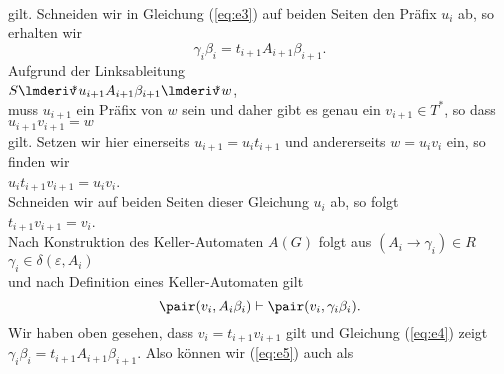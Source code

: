 \begin{enumerate}
            \\[0.2cm]
            gilt.  Schneiden wir in Gleichung (\ref{eq:e3}) auf beiden Seiten den Pr\"afix
            $u_i$ ab, so erhalten wir
            \begin{equation}
              \label{eq:e4}
              \gamma_i \beta_i = t_{i+1} A_{i+1}\beta_{i+1}.
            \end{equation}
            Aufgrund der Linksableitung
            \\[0.2cm]
            \hspace*{1.3cm}
            $S \lmderiv\!\!^* u_{i+1}A_{i+1}\beta_{i+1} \lmderiv\!\!^* w$,
            \\[0.2cm] 
            muss $u_{i+1}$ ein Pr\"afix von $w$ sein und daher gibt es genau ein $v_{i+1} \in T^*$, so dass
            \\[0.2cm]
            \hspace*{1.3cm}
            $u_{i+1} v_{i+1} = w$ 
            \\[0.2cm]
            gilt.  Setzen wir hier einerseits $u_{i+1} = u_i t_{i+1}$ und andererseits $w = u_iv_i$ ein, so
            finden wir 
            \\[0.2cm]
            \hspace*{1.3cm}
            $u_i t_{i+1} v_{i+1} = u_i v_i$.
            \\[0.2cm]
            Schneiden wir auf beiden Seiten dieser Gleichung $u_i$ ab, so folgt
            \\[0.2cm]
            \hspace*{1.3cm}
            $t_{i+1} v_{i+1} = v_i$.
            \\[0.2cm]
            Nach Konstruktion des Keller-Automaten $A(G)$ folgt aus $(A_i \rightarrow \gamma_i) \in R$
            \\[0.2cm]
            \hspace*{1.3cm}
            $\gamma_i \in \delta(\varepsilon, A_i)$
            \\[0.2cm]
            und nach Definition eines Keller-Automaten gilt
            \begin{equation}
              \label{eq:e5}
              \pair(v_i,A_i \beta_i) \vdash \pair(v_i,\gamma_i \beta_i).
            \end{equation}
            Wir haben oben gesehen, dass
            $v_i = t_{i+1}v_{i+1}$ gilt und Gleichung (\ref{eq:e4}) zeigt $\gamma_i \beta_i = t_{i+1}A_{i+1}\beta_{i+1}$.
            Also k\"onnen wir  (\ref{eq:e5}) auch als
            \begin{equation}

\end{equation}
\end{enumerate}

